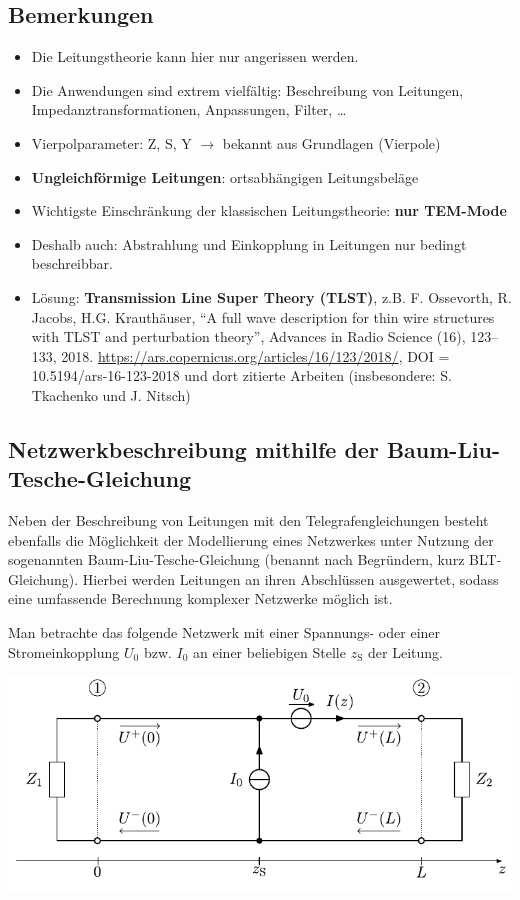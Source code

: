 \subsection{Bemerkungen}
\begin{itemize}
	\item Die Leitungstheorie kann hier nur angerissen werden.
	\item Die Anwendungen sind extrem vielfältig: Beschreibung von Leitungen, Impedanztransformationen, Anpassungen, Filter, \dots
	\item Vierpolparameter: Z, S, Y \(\to\) bekannt aus Grundlagen (Vierpole)
	\item \textbf{Ungleichförmige Leitungen}: ortsabhängigen Leitungsbeläge
	\item Wichtigste Einschränkung der klassischen Leitungstheorie: \textbf{nur TEM-Mode}
	\item Deshalb auch: Abstrahlung und Einkopplung in Leitungen nur bedingt beschreibbar.
	\item Lösung: \textbf{Transmission Line Super Theory (TLST)}, z.B. F. Ossevorth, R. Jacobs, H.G. Krauthäuser,
	\enquote{A full wave description for thin wire structures with TLST and perturbation theory}, Advances in Radio Science (16), 123--133, 2018. \url{https://ars.copernicus.org/articles/16/123/2018/}, DOI = 10.5194/ars-16-123-2018 und dort zitierte Arbeiten (insbesondere: S. Tkachenko und J. Nitsch)
\end{itemize}
\subsection{Netzwerkbeschreibung mithilfe der Baum-Liu-Tesche-Gleichung}
Neben der Beschreibung von Leitungen mit den Telegrafengleichungen besteht ebenfalls die Möglichkeit der Modellierung eines Netzwerkes unter Nutzung der sogenannten Baum-Liu-Tesche-Gleichung (benannt nach Begründern, kurz BLT-Gleichung). Hierbei werden Leitungen an ihren Abschlüssen ausgewertet, sodass eine umfassende Berechnung komplexer Netzwerke möglich ist.

Man betrachte das folgende Netzwerk mit einer Spannungs- oder einer Stromeinkopplung $U_{0}$ bzw. $I_{0}$ an einer beliebigen Stelle $z_{\mathrm{S}}$ der Leitung.

\begin{center}
	\includegraphics{res/LT6}
\end{center}

